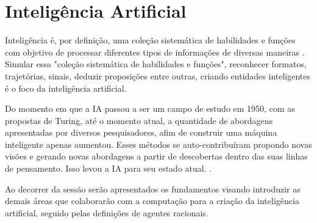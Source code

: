 \section{Inteligência Artificial}

Inteligência é, por definição, uma coleção sistemática de habilidades e funções com objetivo de processar diferentes tipos de informações de diversas maneiras \cite[49]{guilford1982cognitive}. Simular essa "coleção sistemática de habilidades e funções", reconhecer formatos, trajetórias, sinais, deduzir proposições entre outras, criando entidades inteligentes é o foco da inteligência artificial.

Do momento em que a IA passou a ser um campo de estudo em 1950, com as propostas de Turing, até o momento atual, a quantidade de abordagens apresentadas por diversos pesquisadores, afim de construir uma máquina inteligente apenas aumentou. Esses métodos se auto-contribuíram propondo novas visões e gerando novas abordagens a partir de descobertas dentro das suas linhas de pensamento. Isso levou a IA para seu estado atual. \cite[1-2]{russell2003artificial}.

Ao decorrer da sessão serão apresentados os fundamentos visando introduzir as demais áreas que colaborarão com a computação para a criação da inteligência artificial, seguido pelas definições de agentes racionais.



